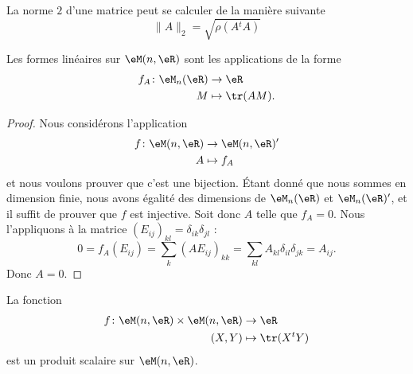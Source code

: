 \begin{theorem}
    La norme $2$ d'une matrice peut se calculer de la manière suivante $$\|A\|_2=\sqrt{\rho(A{^t}A)}$$
\end{theorem}

\begin{lemma}
    Les formes linéaires sur \( \eM(n,\eR)\) sont les applications de la forme
    \begin{equation}
        \begin{aligned}
            f_A\colon \eM_n(\eR)&\to \eR \\
            M&\mapsto \tr(AM). 
        \end{aligned}
    \end{equation}
\end{lemma}

\begin{proof}
    Nous considérons l'application
    \begin{equation}
        \begin{aligned}
            f\colon \eM(n,\eR)&\to \eM(n,\eR)' \\
            A&\mapsto f_A 
        \end{aligned}
    \end{equation}
    et nous voulons prouver que c'est une bijection. Étant donné que nous sommes en dimension finie, nous avons égalité des dimensions de \( \eM_n(\eR)\) et \( \eM_n(\eR)'\), et il suffit de prouver que \( f\) est injective. Soit donc \( A\) telle que \( f_A=0\). Nous l'appliquons à la matrice \( (E_{ij})_{kl}=\delta_{ik}\delta_{jl}\) :
    \begin{equation}
            0=f_A(E_{ij})
            =\sum_{k}(AE_{ij})_{kk}
            =\sum_{kl}A_{kl}\delta_{il}\delta_{jk}
            =A_{ij}.
    \end{equation}
    Donc \( A=0\).
\end{proof}

\begin{proposition} \label{PropMAQoKAg}
    La fonction
    \begin{equation}
        \begin{aligned}
            f\colon \eM(n,\eR)\times \eM(n,\eR)&\to \eR \\
            (X,Y)&\mapsto \tr(X^tY) 
        \end{aligned}
    \end{equation}
    est un produit scalaire sur \( \eM(n,\eR)\).
\end{proposition}

